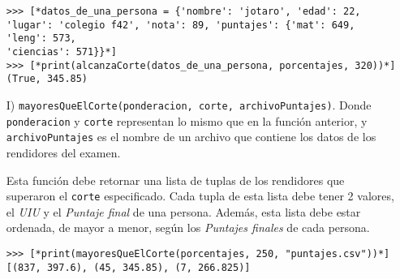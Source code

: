 \begin{enumerate}
\begin{lstlisting}[style=consola]
>>> [*datos_de_una_persona = {'nombre': 'jotaro', 'edad': 22, 
'lugar': 'colegio f42', 'nota': 89, 'puntajes': {'mat': 649, 'leng': 573,
'ciencias': 571}}*]
>>> [*print(alcanzaCorte(datos_de_una_persona, porcentajes, 320))*]
(True, 345.85)
\end{lstlisting}


    \item[I)] \texttt{mayoresQueElCorte(ponderacion, corte, archivoPuntajes)}. Donde \texttt{ponderacion} y \texttt{corte} representan lo mismo que en la función anterior, y \texttt{archivoPuntajes} es el nombre de un archivo que contiene los datos de los rendidores del examen.
    
    Esta función debe retornar una lista de tuplas de los rendidores que superaron el \texttt{corte} especificado. Cada tupla de esta lista debe tener 2 valores, el \textit{UIU} y el \textit{Puntaje final} de una persona. Además, esta lista debe estar ordenada, de mayor a menor, según los \textit{Puntajes finales} de cada persona.
    
\begin{lstlisting}[style=consola]
>>> [*print(mayoresQueElCorte(porcentajes, 250, "puntajes.csv"))*]
[(837, 397.6), (45, 345.85), (7, 266.825)]
\end{lstlisting}

\end{enumerate}

